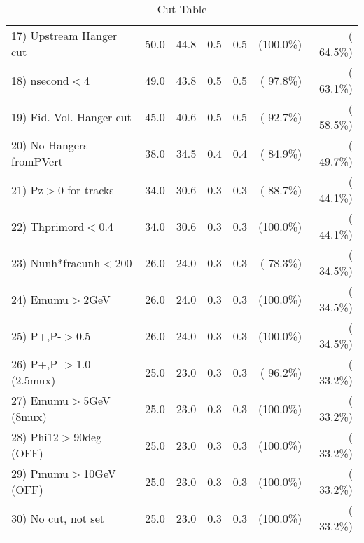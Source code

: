 \begin{table}[h!]
\begin{tabular}{||l||r|r|r|r|r|r||}
 17) Upstream Hanger cut  &         50.0 &         44.8 &          0.5 &          0.5 & (100.0\%) & ( 64.5\%) \\
 18) nsecond$<$4          &         49.0 &         43.8 &          0.5 &          0.5 & ( 97.8\%) & ( 63.1\%) \\
 19) Fid. Vol. Hanger cut &         45.0 &         40.6 &          0.5 &          0.5 & ( 92.7\%) & ( 58.5\%) \\
 20) No Hangers fromPVert &         38.0 &         34.5 &          0.4 &          0.4 & ( 84.9\%) & ( 49.7\%) \\
 21) Pz$>$0 for tracks    &         34.0 &         30.6 &          0.3 &          0.3 & ( 88.7\%) & ( 44.1\%) \\
 22) Thprimord$<$0.4      &         34.0 &         30.6 &          0.3 &          0.3 & (100.0\%) & ( 44.1\%) \\
 23) Nunh*fracunh$<$200   &         26.0 &         24.0 &          0.3 &          0.3 & ( 78.3\%) & ( 34.5\%) \\
 24) Emumu$>$2GeV         &         26.0 &         24.0 &          0.3 &          0.3 & (100.0\%) & ( 34.5\%) \\
 25) P+,P-$>$0.5          &         26.0 &         24.0 &          0.3 &          0.3 & (100.0\%) & ( 34.5\%) \\
 26) P+,P-$>$1.0 (2.5mux) &         25.0 &         23.0 &          0.3 &          0.3 & ( 96.2\%) & ( 33.2\%) \\
 27) Emumu$>$5GeV  (8mux) &         25.0 &         23.0 &          0.3 &          0.3 & (100.0\%) & ( 33.2\%) \\
 28) Phi12$>$90deg  (OFF) &         25.0 &         23.0 &          0.3 &          0.3 & (100.0\%) & ( 33.2\%) \\
 29) Pmumu$>$10GeV  (OFF) &         25.0 &         23.0 &          0.3 &          0.3 & (100.0\%) & ( 33.2\%) \\
 30) No cut, not set      &         25.0 &         23.0 &          0.3 &          0.3 & (100.0\%) & ( 33.2\%) \\
 \hline
 \hline
 \end{tabular}
 \caption{Cut Table           }
 \label{tab-cutcohjpsi-mumu_anuecc}
 \end{table}
